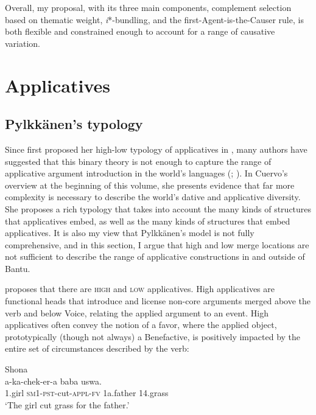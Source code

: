 \documentclass[output=paper,modfonts,nonflat,colorlinks,citecolor=brown]{langsci/langscibook}
\begin{document}
Overall, my proposal, with its three main components, complement selection based on thematic weight, \textit{i}*-bundling, and the first-Agent-is-the-Causer rule, is both flexible and constrained enough to account for a range of causative variation.

\section{Applicatives}\label{sec:wechsler:3}

\subsection{Pylkkänen’s typology}\label{sec:wechsler:3.1}

Since \citeauthor{Pylkkänen2002} first proposed her high-low typology of applicatives in \citeyear{Pylkkänen2002}, many authors have suggested that this binary theory is not enough to capture the range of applicative argument introduction in the world’s languages (\citealt{Jeong2007,Peterson2007};  \citealt{GeorgalaEtAl2008,Cuervo2003, Cuervo2010born, Cuervo2012, Cuervo2015,Tsai2009,Kim2011thesis,Kim2012heads,Georgala2012}). In Cuervo’s overview at the beginning of this volume, she presents evidence that far more complexity is necessary to describe the world’s dative and applicative diversity. She proposes a rich typology that takes into account the many kinds of structures that applicatives embed, as well as the many kinds of structures that embed applicatives. It is also my view that Pylkkänen’s model is not fully comprehensive, and in this section, I argue that high and low merge locations are not sufficient to describe the range of applicative constructions in and outside of Bantu.


\citet{Pylkkänen2008} proposes that there are \textsc{high} and \textsc{low} applicatives. High applicatives are functional heads that introduce and license non-core arguments merged above the verb and below Voice, relating the applied argument to an event. High applicatives often convey the notion of a favor, where the applied object, prototypically (though not always) a Benefactive, is positively impacted by the entire set of circumstances described by the verb:


\ea\label{ex:wechsler:12}
Shona\\
 {a-ka-chek-er-a}                  {baba}  {uswa}.\\
1.girl     \textsc{sm1}{}-\textsc{pst}{}-cut-\textsc{appl-fv}   1a.father  14.grass\\
\glt ‘The girl cut grass for the father.'
\z
\end{document}

